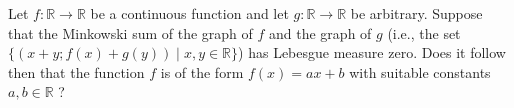Let $f : \mathbb{R} \to \mathbb{R}$ be a continuous function and let $g : \mathbb{R} \to \mathbb{R}$ be arbitrary. Suppose that the Minkowski sum of the graph of $f$ and the graph of $g$ (i.e., the set $\{( x+y; f(x)+g(y) ) \mid x,  y \in \mathbb{R}\}$) has Lebesgue measure zero. Does it follow then that the function $f$ is of the form $f(x) = ax + b$ with suitable constants $a, b \in \mathbb{R}$ ?